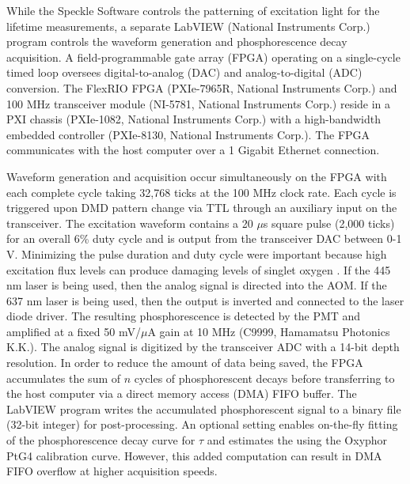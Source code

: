 While the Speckle Software controls the patterning of excitation light for the lifetime measurements, a separate LabVIEW (National Instruments Corp.) program controls the waveform generation and phosphorescence decay acquisition. A field-programmable gate array (FPGA) operating on a single-cycle timed loop oversees digital-to-analog (DAC) and analog-to-digital (ADC) conversion. The FlexRIO FPGA (PXIe-7965R, National Instruments Corp.) and 100 MHz transceiver module (NI-5781, National Instruments Corp.) reside in a PXI chassis (PXIe-1082, National Instruments Corp.) with a high-bandwidth embedded controller (PXIe-8130, National Instruments Corp.). The FPGA communicates with the host computer over a 1 Gigabit Ethernet connection.

Waveform generation and acquisition occur simultaneously on the FPGA with each complete cycle taking 32,768 ticks at the 100 MHz clock rate. Each cycle is triggered upon DMD pattern change via TTL through an auxiliary input on the transceiver. The excitation waveform contains a 20 $\mu$s square pulse (2,000 ticks) for an overall 6\% duty cycle and is output from the transceiver DAC between 0-1 V. Minimizing the pulse duration and duty cycle were important because high excitation flux levels can produce damaging levels of singlet oxygen \cite{Wilson:2005te}. If the 445 nm laser is being used, then the analog signal is directed into the AOM. If the 637 nm laser is being used, then the output is inverted and connected to the laser diode driver. The resulting phosphorescence is detected by the PMT and amplified at a fixed 50 mV/$\mu$A gain at 10 MHz (C9999, Hamamatsu Photonics K.K.). The analog signal is digitized by the transceiver ADC with a 14-bit depth resolution. In order to reduce the amount of data being saved, the FPGA accumulates the sum of $n$ cycles of phosphorescent decays before transferring to the host computer via a direct memory access (DMA) FIFO buffer. The LabVIEW program writes the accumulated phosphorescent signal to a binary file (32-bit integer) for post-processing. An optional setting enables on-the-fly fitting of the phosphorescence decay curve for $\tau$ and estimates the  using the Oxyphor PtG4 calibration curve. However, this added computation can result in DMA FIFO overflow at higher acquisition speeds.


